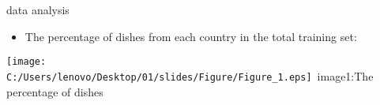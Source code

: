 \documentclass[
 size=14pt,
 paper=smartboard,  %
 mode=present, 		%
 display=slides, 	%
 style=tuliplab,  	%
 pauseslide,
 fleqn,leqno]{powerdot}
\begin{document}
\begin{slide}[toc=,bm=]{data analysis}
  \begin{itemize}
    \item  The percentage of dishes from each country in the total training set:\\
  \end{itemize}
  \begin{table} 
      \texttt{[image: C:/Users/lenovo/Desktop/01/slides/Figure/Figure\_1.eps]}\
        {image1:The percentage of dishes}\
  \end{table}
  
  \end{slide}
\end{document}

